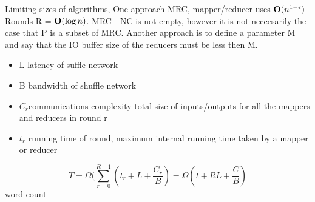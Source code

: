 \documentclass[11pt,fleqn]{article}
\begin{document}
Limiting sizes of algorithms, One approach MRC, mapper/reducer uses $\mbox{{\bfseries O}}(n^{1-\epsilon})$ Rounds R = $\mbox{{\bfseries O}}(\log n)$.  MRC - NC is not empty, however it is not neccesarily the case that P is a subset of MRC. Another approach is to define a parameter M and say that the IO buffer size of the reducers must be less then M. 

\begin{itemize}
\item
L latency of suffle network
\item
B bandwidth of shuffle network
\item
$C_r $communications complexity total size of inputs/outputs for all the mappers and reducers in round r
\item
$t_r $ running time of round, maximum internal running time taken by a mapper or reducer
\end{itemize}
\[
T = \Omega(\sum_{r=0}^{R-1}(t_r +L + \frac{C_r}{B}) = \Omega(t + RL + \frac{C}{B})
\]
word count 
\end{document}
